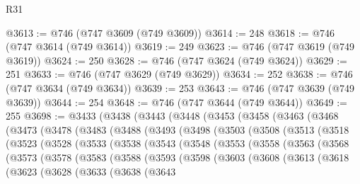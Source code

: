\begin{lexlean}{R31}
\begin{coremodule}
@3613 := @746 (@747 @3609 (@749 @3609))
@3614 := 248
@3618 := @746 (@747 @3614 (@749 @3614))
@3619 := 249
@3623 := @746 (@747 @3619 (@749 @3619))
@3624 := 250
@3628 := @746 (@747 @3624 (@749 @3624))
@3629 := 251
@3633 := @746 (@747 @3629 (@749 @3629))
@3634 := 252
@3638 := @746 (@747 @3634 (@749 @3634))
@3639 := 253
@3643 := @746 (@747 @3639 (@749 @3639))
@3644 := 254
@3648 := @746 (@747 @3644 (@749 @3644))
@3649 := 255
@3698 := @3433
    (@3438
      (@3443
        (@3448
          (@3453
            (@3458
              (@3463
                (@3468
                  (@3473
                    (@3478
                      (@3483
                        (@3488
                          (@3493
                            (@3498
                              (@3503
                                (@3508
                                  (@3513
                                    (@3518
                                      (@3523
                                        (@3528
                                          (@3533
                                            (@3538
                                              (@3543
                                                (@3548
                                                  (@3553
                                                    (@3558
                                                      (@3563
                                                        (@3568
                                                          (@3573
                                                            (@3578
                                                              (@3583
                                                                (@3588
                                                                  (@3593
                                                                    (@3598
                                                                      (@3603
                                                                        (@3608
                                                                          (@3613
                                                                            (@3618
                                                                              (@3623
                                                                                (@3628
                                                                                  (@3633
                                                                                    (@3638
                                                                                      (@3643

\end{coremodule}
\end{lexlean}

